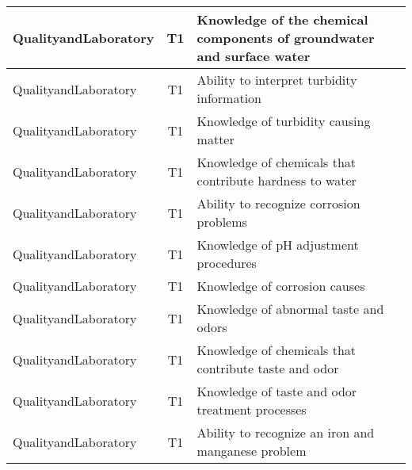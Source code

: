\documentclass{article}
\begin{document}
\begin{table}[]
\begin{tabular}{|l|c|l|}
QualityandLaboratory                   & T1             & Knowledge of the   chemical components of groundwater and surface water                                                           \\ \hline
QualityandLaboratory                   & T1             & Ability to interpret   turbidity information                                                                                      \\ \hline
QualityandLaboratory                   & T1             & Knowledge of   turbidity causing matter                                                                                           \\ \hline
QualityandLaboratory                   & T1             & Knowledge of   chemicals that contribute hardness to water                                                                        \\ \hline
QualityandLaboratory                   & T1             & Ability to recognize   corrosion problems                                                                                         \\ \hline
QualityandLaboratory                   & T1             & Knowledge of pH   adjustment procedures                                                                                           \\ \hline
QualityandLaboratory                   & T1             & Knowledge of   corrosion causes                                                                                                   \\ \hline
QualityandLaboratory                   & T1             & Knowledge of abnormal   taste and odors                                                                                           \\ \hline
QualityandLaboratory                   & T1             & Knowledge of   chemicals that contribute taste and odor                                                                           \\ \hline
QualityandLaboratory                   & T1             & Knowledge of taste   and odor treatment processes                                                                                 \\ \hline
QualityandLaboratory                   & T1             & Ability to recognize   an iron and manganese problem                                                                              \\ \hline

\end{tabular}
\end{table}
\end{document}
